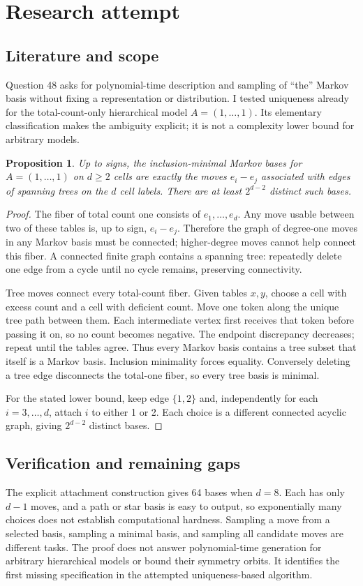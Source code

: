 \documentclass[11pt]{article}
\newtheorem{proposition}{Proposition}
\begin{document}
\section{Research attempt}
\subsection{Literature and scope}
Question 48 asks for polynomial-time description and sampling of ``the'' Markov basis without fixing a representation or distribution. I tested uniqueness already for the total-count-only hierarchical model $A=(1,\ldots,1)$. Its elementary classification makes the ambiguity explicit; it is not a complexity lower bound for arbitrary models.
\begin{proposition}
Up to signs, the inclusion-minimal Markov bases for $A=(1,\ldots,1)$ on $d\ge2$ cells are exactly the moves $e_i-e_j$ associated with edges of spanning trees on the $d$ cell labels. There are at least $2^{d-2}$ distinct such bases.
\end{proposition}
\begin{proof}
The fiber of total count one consists of $e_1,\ldots,e_d$. Any move usable between two of these tables is, up to sign, $e_i-e_j$. Therefore the graph of degree-one moves in any Markov basis must be connected; higher-degree moves cannot help connect this fiber. A connected finite graph contains a spanning tree: repeatedly delete one edge from a cycle until no cycle remains, preserving connectivity.

Tree moves connect every total-count fiber. Given tables $x,y$, choose a cell with excess count and a cell with deficient count. Move one token along the unique tree path between them. Each intermediate vertex first receives that token before passing it on, so no count becomes negative. The endpoint discrepancy decreases; repeat until the tables agree. Thus every Markov basis contains a tree subset that itself is a Markov basis. Inclusion minimality forces equality. Conversely deleting a tree edge disconnects the total-one fiber, so every tree basis is minimal.

For the stated lower bound, keep edge $\{1,2\}$ and, independently for each $i=3,\ldots,d$, attach $i$ to either 1 or 2. Each choice is a different connected acyclic graph, giving $2^{d-2}$ distinct bases.
\end{proof}
\subsection{Verification and remaining gaps}
The explicit attachment construction gives 64 bases when $d=8$. Each has only $d-1$ moves, and a path or star basis is easy to output, so exponentially many choices does not establish computational hardness. Sampling a move from a selected basis, sampling a minimal basis, and sampling all candidate moves are different tasks. The proof does not answer polynomial-time generation for arbitrary hierarchical models or bound their symmetry orbits. It identifies the first missing specification in the attempted uniqueness-based algorithm.
\end{document}
